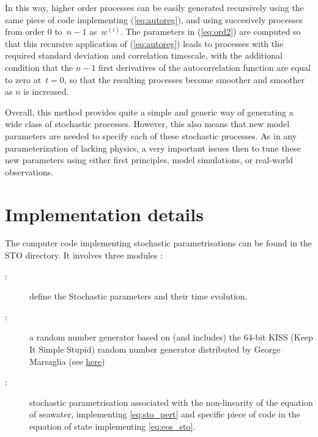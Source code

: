 \documentclass[../tex_main/NEMO_manual]{subfiles}
\begin{document}
\noindent
In this way, higher order processes can be easily generated recursively using the same piece of code implementing
(\autoref{eq:autoreg}), and using succesively processes from order $0$ to~$n-1$ as~$w^{(i)}$.
The parameters in (\autoref{eq:ord2}) are computed so that this recursive application of
(\autoref{eq:autoreg}) leads to processes with the required standard deviation and correlation timescale,
with the additional condition that the $n-1$ first derivatives of the autocorrelation function are equal to
zero at~$t=0$, so that the resulting processes become smoother and smoother as $n$ is increased.

Overall, this method provides quite a simple and generic way of generating a wide class of stochastic processes.
However, this also means that new model parameters are needed to specify each of these stochastic processes.
As in any parameterization of lacking physics, a very important issues then to tune these new parameters using
either first principles, model simulations, or real-world observations.

\section{Implementation details}
\label{sec:STO_thech_details}



The computer code implementing stochastic parametrisations can be found in the STO directory.
It involves three modules : 
\begin{description}
\item[:]
  define the Stochastic parameters and their time evolution.
\item[:]
  a random number generator based on (and includes) the 64-bit KISS (Keep It Simple Stupid) random number generator
  distributed by George Marsaglia
  (see \href{https://groups.google.com/forum/#!searchin/comp.lang.fortran/64-bit$20KISS$20RNGs}{here})
\item[:]
  stochastic parametrisation associated with the non-linearity of the equation of seawater,
  implementing \autoref{eq:sto_pert} and specific piece of code in
  the equation of state implementing \autoref{eq:eos_sto}.
\end{description}
\end{document}
